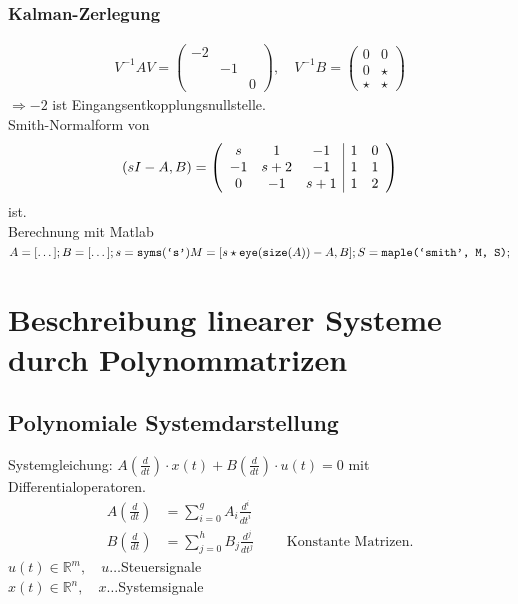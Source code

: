 \documentclass[ngerman]{tudscrreprt}
\begin{document}
\subsection*{Kalman-Zerlegung}
\begin{align*}V^{-1} AV = \begin{pmatrix} -2 &&\\ & -1&\\ &&0\end{pmatrix}, \quad V^{-1}B = \begin{pmatrix}0 & 0\\ 0 & \star\\ \star& \star\end{pmatrix} \end{align*} 
$\Rightarrow -2 $ ist Eingangsentkopplungsnullstelle.\\ 
Smith-Normalform von 
\begin{align*} 
(sI - A, B) = \left(\begin{array}{c | c} 
\begin{matrix} s & 1 & -1\\ -1 & s+2 & -1 \\ 0 & -1 & s+1 \end{matrix} & \begin{matrix} 1 & 0\\ 1 & 1\\ 1 & 2\end{matrix} \end{array}\right)
\end{align*} ist. \\ 
Berechnung mit Matlab 
$A = [\dots];\\ B=[\dots];\\ s= \texttt{syms}(\texttt{`s'})\\
M = [s\star \texttt{eye}(\texttt{size}(A)) - A, B];\\ S= \texttt{maple(\texttt{`smith'}, M, S)};
$
\chapter{Beschreibung linearer Systeme durch Polynommatrizen}
\section{Polynomiale Systemdarstellung}
Systemgleichung: $A\left(\frac{d}{dt} \right) \cdot x(t) + B (\frac{d}{dt})\cdot u(t) = 0$ mit Differentialoperatoren.\begin{align*} A\left(\frac{d}{dt}\right) &= \sum\limits_{i=0}^{g} A_i \frac{d^i}{dt^i}\\ 
B\left(\frac{d}{dt}\right) &= \sum\limits_{j=0}^{h} B_j \frac{d^j}{dt^j}\qquad \text{ Konstante Matrizen.}\end{align*} 
$u(t) \in \mathbb{R}^m, \quad u\dots $Steuersignale\\ 
$x(t) \in \mathbb{R}^n, \quad x\dots $Systemsignale\\ 
\end{document}
